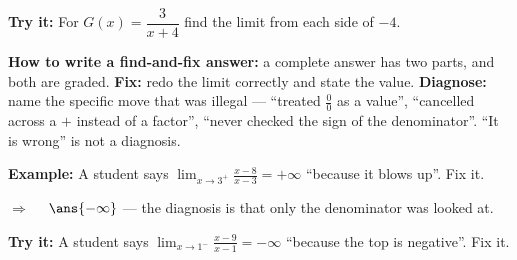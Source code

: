 \documentclass[12pt]{article}
\begin{document}
\begin{tryitbox}
\textbf{Try it:} \quad For $G(x) = \dfrac{3}{x+4}$ find the limit from each side
of $-4$.\\[2pt]
\end{tryitbox}


\begin{formulabox}
\textbf{How to write a find-and-fix answer:} a complete answer has two parts,
and both are graded. \textbf{Fix:} redo the limit correctly and state the value.
\textbf{Diagnose:} name the specific move that was illegal --- ``treated
$\frac{0}{0}$ as a value'', ``cancelled across a $+$ instead of a factor'',
``never checked the sign of the denominator''. ``It is wrong'' is not a
diagnosis.
\end{formulabox}

\begin{examplebox}
\textbf{Example:} \quad A student says $\displaystyle\lim_{x \to 3^+}
\frac{x-8}{x-3} = +\infty$ ``because it blows up''. Fix it.

$\Rightarrow\quad$ $\ans{-\infty}$ --- the diagnosis is that only the denominator was looked at.
\end{examplebox}

\begin{tryitbox}
\textbf{Try it:} \quad A student says $\displaystyle\lim_{x \to 1^-}
\frac{x-9}{x-1} = -\infty$ ``because the top is negative''. Fix it.\\[2pt]
\end{tryitbox}
\end{document}
